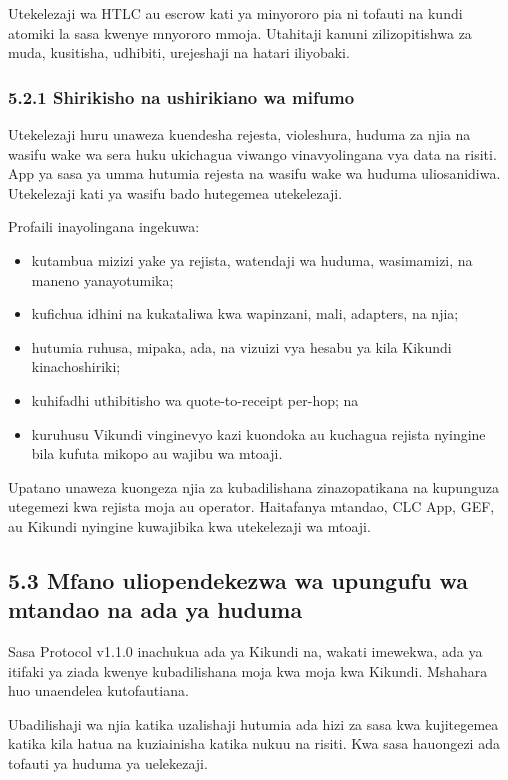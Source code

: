 \documentclass[11pt]{article}
\begin{document}
Utekelezaji wa HTLC au escrow kati ya minyororo pia ni tofauti na kundi atomiki la sasa kwenye mnyororo mmoja. Utahitaji kanuni zilizopitishwa za muda, kusitisha, udhibiti, urejeshaji na hatari iliyobaki.

\subsubsection*{5.2.1 Shirikisho na ushirikiano wa mifumo}

Utekelezaji huru unaweza kuendesha rejesta, violeshura, huduma za njia na wasifu wake wa sera huku ukichagua viwango vinavyolingana vya data na risiti. App ya sasa ya umma hutumia rejesta na wasifu wake wa huduma uliosanidiwa. Utekelezaji kati ya wasifu bado hutegemea utekelezaji.

Profaili inayolingana ingekuwa:

\begin{itemize}[leftmargin=*]
\item kutambua mizizi yake ya rejista, watendaji wa huduma, wasimamizi, na maneno yanayotumika;
\item kufichua idhini na kukataliwa kwa wapinzani, mali, adapters, na njia;
\item hutumia ruhusa, mipaka, ada, na vizuizi vya hesabu ya kila Kikundi kinachoshiriki;
\item kuhifadhi uthibitisho wa quote-to-receipt per-hop; na
\item kuruhusu Vikundi vinginevyo kazi kuondoka au kuchagua rejista nyingine bila kufuta mikopo au wajibu wa mtoaji.
\end{itemize}
Upatano unaweza kuongeza njia za kubadilishana zinazopatikana na kupunguza utegemezi kwa rejista moja au operator. Haitafanya mtandao, CLC App, GEF, au Kikundi nyingine kuwajibika kwa utekelezaji wa mtoaji.

\subsection*{5.3 Mfano uliopendekezwa wa upungufu wa mtandao na ada ya huduma}

Sasa Protocol v1.1.0 inachukua ada ya Kikundi na, wakati imewekwa, ada ya itifaki ya ziada kwenye kubadilishana moja kwa moja kwa Kikundi. Mshahara huo unaendelea kutofautiana.

Ubadilishaji wa njia katika uzalishaji hutumia ada hizi za sasa kwa kujitegemea katika kila hatua na kuziainisha katika nukuu na risiti. Kwa sasa hauongezi ada tofauti ya huduma ya uelekezaji.
\end{document}
